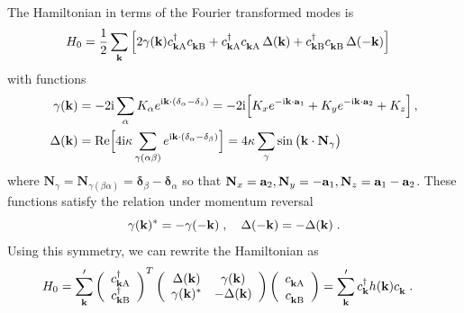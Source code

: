 The Hamiltonian in terms of the Fourier transformed modes is
\begin{align}
    H_0 &= \frac{1}{2} \sum_{\mb{k}} \Big[
    2\gamma(\mb{k}) c_{\mb{k}\mathrm{A}}^\dagger c_{\mb{k}\mathrm{B}}^\pd +
     c_{\mb{k}\mathrm{A}}^\dagger c_{\mb{k}\mathrm{A}}^\pd \, \Delta(\mb{k})+
      c_{\mb{k}\mathrm{B}}^\dagger c_{\mb{k}\mathrm{B}}^\pd \, \Delta(-\mb{k}) \Big]
\end{align}
with functions
\begin{align}
        \gamma(\mathbf{k}) &=
        -2 \mathrm{i}  \sum_\alpha K_\alpha e^{\mathrm{i} \mathbf{k}\cdot (\mathbf{\delta}_\alpha-\mathbf{\delta}_z)}
        = - 2 \mathrm{i} \Big[  K_x e^{-\mathrm{i} \mathbf{k}\cdot \mathbf{a}_1} +K_y e^{-\mathrm{i} \mathbf{k}\cdot \mathbf{a}_2} + K_z  \Big] \, ,
        \\
    \Delta(\mathbf{k}) &=
    \text{Re}\Big[  4 \mathrm{i} \kappa \sum_{\gamma(\alpha\beta) } e^{\mathrm{i} \mathbf{k}\cdot(\delta_\alpha-\delta_\beta)} \Big] =
    4 \kappa \sum_\gamma \sin \big( \mathbf{k}\cdot \mathbf{N}_\gamma  \big)
\end{align}
where $\mathbf{N}_{\gamma}=\mathbf{N}_{\gamma(\beta \alpha )}=\bm{\delta}_{\beta}-\bm{\delta}_{\alpha}$ so that $\mathbf{N}_{x}=\mathbf{a}_2, \mathbf{N}_{y}=-\mathbf{a}_1, \mathbf{N}_{z}=\mathbf{a}_1-\mathbf{a}_2$. %
These functions satisfy the relation under momentum reversal
\begin{equation}
     \gamma(\mathbf{k})^\ast=-\gamma(-\mathbf{k}) \; , \quad  \Delta(-\mathbf{k})=-\Delta(\mathbf{k}) \; .
\end{equation}
Using this symmetry, we can rewrite the Hamiltonian as  %
\begin{align}
    H_0 &=   \sum_{\mb{k}}^{\prime}
    \left(\begin{array}{c} c_{\mb{k}\mathrm{A}}^\dagger \\ c_{\mb{k}\mathrm{B}}^\dagger
    \end{array}\right)^{T}
    \left(\begin{array}{cc}
        \Delta(\mb{k}) & \gamma(\mb{k}) \\
       \gamma(\mb{k})^\ast  & -\Delta(\mb{k})
    \end{array}\right)
    \left(\begin{array}{c} c_{\mb{k}\mathrm{A}}^\pd \\ c_{\mb{k}\mathrm{B}}^\pd
    \end{array}\right)
    =  \sum_{\mb{k}}^{\prime}  c_{\mb{k}}^\dagger h(\mb{k}) c_{\mb{k}}^\pd \; .
\end{align}
